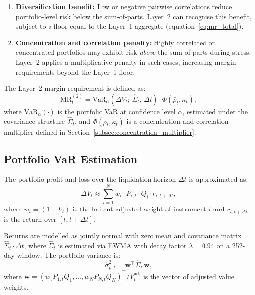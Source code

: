 \documentclass[12pt, a4paper]{article}
\newcommand{\MR}{\mathrm{MR}}
\newcommand{\VaR}{\mathrm{VaR}}
\begin{document}
\begin{enumerate}[leftmargin=1.5em]
    \item \textbf{Diversification benefit:} Low or negative pairwise
    correlations reduce portfolio-level risk below the sum-of-parts.
    Layer~2 can recognise this benefit, subject to a floor equal to the
    Layer~1 aggregate (equation~\eqref{eq:mr_total}).
    \item \textbf{Concentration and correlation penalty:} Highly correlated
    or concentrated portfolios may exhibit risk \emph{above} the sum-of-parts
    during stress. Layer~2 applies a multiplicative penalty in such cases,
    increasing margin requirements beyond the Layer~1 floor.
\end{enumerate}

\noindent The Layer~2 margin requirement is defined as:
\begin{equation}
    \MR_t^{(2)} = \VaR_\alpha\!\left(\Delta V_t;\,\hat{\Sigma}_t,\,\Delta t\right)
    \cdot \Phi(\bar{\rho}_t, \kappa_t),
    \label{eq:layer2}
\end{equation}
where $\VaR_\alpha(\cdot)$ is the portfolio VaR at confidence level $\alpha$,
estimated under the covariance structure $\hat{\Sigma}_t$, and
$\Phi(\bar{\rho}_t, \kappa_t)$ is a concentration and correlation multiplier
defined in Section~\ref{subsec:concentration_multiplier}.

\subsection{Portfolio VaR Estimation}
\label{subsec:portfolio_var}

The portfolio profit-and-loss over the liquidation horizon $\Delta t$ is
approximated as:
\[
\Delta V_t \approx \sum_{i=1}^{N} w_i \cdot P_{i,t} \cdot Q_i \cdot r_{i,t+\Delta t},
\]
where $w_i = (1-h_i)$ is the haircut-adjusted weight of instrument $i$
and $r_{i,t+\Delta t}$ is the return over $[t, t+\Delta t]$.

\noindent Returns are modelled as jointly normal with zero mean and
covariance matrix $\hat{\Sigma}_t \cdot \Delta t$, where $\hat{\Sigma}_t$
is estimated via EWMA with decay factor $\lambda = 0.94$ on a 252-day
window. The portfolio variance is:
\begin{equation}
    \hat{\sigma}_{p,t}^2 = \mathbf{w}^\top \hat{\Sigma}_t\, \mathbf{w},
    \label{eq:port_var}
\end{equation}
where $\mathbf{w} = (w_1 P_{1,t} Q_1, \ldots, w_N P_{N,t} Q_N)^\top /
V_t^{\mathrm{adj}}$ is the vector of adjusted value weights.
\end{document}
